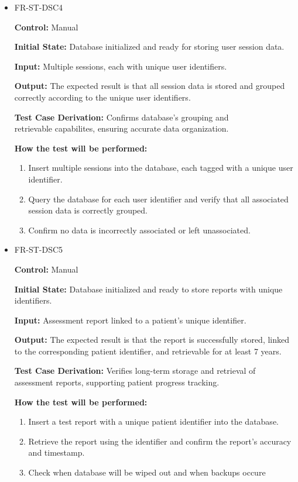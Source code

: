 \documentclass[12pt, titlepage]{article}
\begin{document}
\begin{itemize}
  \item FR-ST-DSC4
  \begin{mdframed}[linewidth=0.5mm]
      \textbf{Control:} Manual \par
      \textbf{Initial State:} Database initialized and ready for storing user session data. \par
      \textbf{Input:} Multiple sessions, each with unique user identifiers. \par
      \textbf{Output:} The expected result is that all session data is stored and grouped correctly according to the unique user identifiers. \par
      \textbf{Test Case Derivation:} Confirms database's grouping and \\retrievable capabilites, ensuring accurate data organization.\par
      \textbf{How the test will be performed:}
      \begin{enumerate}[noitemsep]
        \item Insert multiple sessions into the database, each tagged with a unique user identifier.
        \item Query the database for each user identifier and verify that all associated session data is correctly grouped.
        \item Confirm no data is incorrectly associated or left unassociated.
      \end{enumerate}
  \end{mdframed}

  \item FR-ST-DSC5
  \begin{mdframed}[linewidth=0.5mm]
      \textbf{Control:} Manual \par
      \textbf{Initial State:} Database initialized and ready to store reports with unique identifiers. \par
      \textbf{Input:} Assessment report linked to a patient’s unique identifier. \par
      \textbf{Output:} The expected result is that the report is successfully stored, linked to the corresponding patient identifier, and retrievable for at least 7 years. \par
      \textbf{Test Case Derivation:} Verifies long-term storage and retrieval of assessment reports, supporting patient progress tracking. \par
      \textbf{How the test will be performed:}
      \begin{enumerate}[noitemsep]
        \item Insert a test report with a unique patient identifier into the database.
        \item Retrieve the report using the identifier and confirm the report’s accuracy and timestamp.
        \item Check when database will be wiped out and when backups occure
      \end{enumerate}
  \end{mdframed}

\end{itemize}
\end{document}
